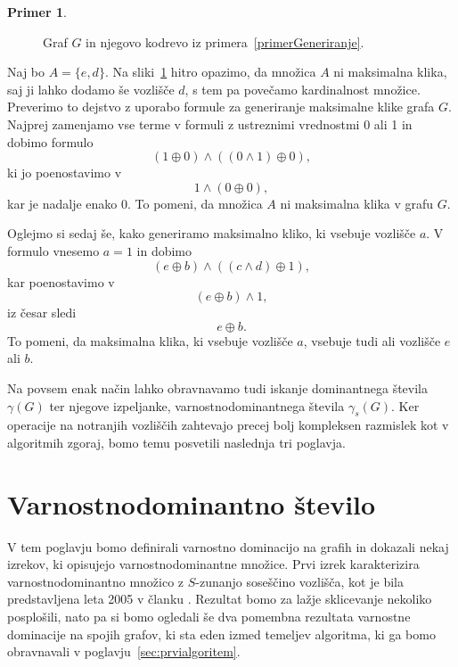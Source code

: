 \documentclass[12pt,a4paper,twoside]{article}
\theoremstyle{definition} %
\newtheorem{primer}[definicija]{Primer}
\theoremstyle{plain} %
\numberwithin{equation}{section}  %
\begin{document}
\begin{enumerate}[label=($\roman*$)]
\begin{primer}
\begin{figure}[h!]
\caption{Graf $G$ in njegovo kodrevo iz primera~\ref{primerGeneriranje}.}
\label{fig:primerGeneriranjaFormule}
\end{figure}

Naj bo  $A = \{e, d\}$. Na sliki~\ref{fig:primerGeneriranjaFormule} hitro opazimo, da množica $A$ ni maksimalna klika, saj ji lahko dodamo še vozlišče $d$, s tem pa povečamo kardinalnost množice. Preverimo to dejstvo z uporabo formule za generiranje maksimalne klike grafa $G$. Najprej zamenjamo vse terme v formuli z ustreznimi vrednostmi 0 ali 1 in dobimo formulo
$$(1 \oplus 0) \land ((0 \land 1) \oplus 0),$$ ki jo poenostavimo v $$1 \land (0 \oplus 0),$$ kar je nadalje enako 0. To pomeni, da množica $A$ ni maksimalna klika v grafu $G$.

Oglejmo si sedaj še, kako generiramo maksimalno kliko, ki vsebuje vozlišče $a$. V formulo vnesemo $a=1$ in dobimo $$(e \oplus b) \land ((c \land d) \oplus 1),$$ kar poenostavimo v $$(e \oplus b) \land 1,$$ iz česar sledi $$e \oplus b.$$
To pomeni, da maksimalna klika, ki vsebuje vozlišče $a$, vsebuje tudi ali vozlišče $e$ ali $b$.
\end{primer}
\end{enumerate}

Na povsem enak način lahko obravnavamo tudi iskanje dominantnega števila $\gamma(G)$ ter njegove izpeljanke, varnostnodominantnega števila $\gamma_s(G)$. Ker operacije na notranjih vozliščih zahtevajo precej bolj kompleksen razmislek kot v algoritmih zgoraj, bomo temu posvetili naslednja tri poglavja.


\section{Varnostnodominantno število}\label{sec:varnostnadominacija}
V tem poglavju bomo definirali varnostno dominacijo na grafih in dokazali nekaj izrekov, ki opisujejo varnostnodominantne množice. Prvi izrek karakterizira varnostnodominantno množico z $S$-zunanjo soseščino vozlišča, kot je bila predstavljena leta 2005 v članku \cite{cockayne2005protection}. Rezultat bomo za lažje sklicevanje nekoliko posplošili, nato pa si bomo ogledali še dva pomembna rezultata varnostne dominacije na spojih grafov, ki sta eden izmed temeljev algoritma, ki ga bomo obravnavali v poglavju~\ref{sec:prvialgoritem}.
\end{document}
